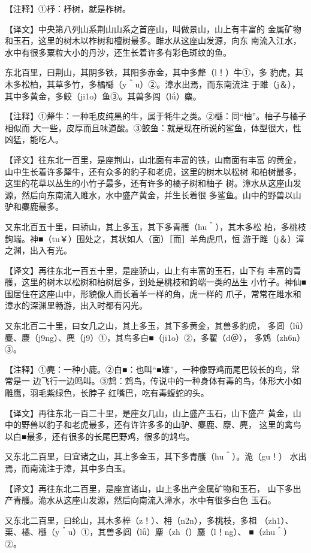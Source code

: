 \documentclass[a4paper,12pt,UTF8,twoside]{ctexbook}
\begin{document}
【注释】①杼：杼树，就是柞树。

【译文】中央第八列山系荆山山系之首座山，叫做景山，山上有丰富的 金属矿物和玉石，这里的树木以柞树和檀树最多。雎水从这座山发源，向东 南流入江水，水中有很多粟粒大小的丹沙，还生长着许多有彩色斑纹的鱼。

东北百里，曰荆山，其阴多铁，其阳多赤金，其中多犛（l！）牛①，多 豹虎，其木多松柏，其草多竹，多橘櫾（y＾u）②。漳水出焉，而东南流注 于雎（j＆），其中多黄金，多鲛（ji1o）鱼③。其兽多闾（lǘ）麋。

【注释】①犛牛：一种毛皮纯黑的牛，属于牦牛之类。②櫾：同“柚”。柚子与橘子相似而 大一些，皮厚而且味道酸。③鲛鱼：就是现在所说的鲨鱼，体型很大，性凶猛，能吃人。

【译文】往东北一百里，是座荆山，山北面有丰富的铁，山南面有丰富 的黄金，山中生长着许多犛牛，还有众多的豹子和老虎，这里的树木以松树 和柏树最多，这里的花草以丛生的小竹子最多，还有许多的橘子树和柚子 树。漳水从这座山发源，然后向东南流入雎水，水中盛产黄金，并生长着很 多鲨鱼。山中的野兽以山驴和麋鹿最多。

又东北百五十里，曰骄山，其上多玉，其下多青雘（hu＾），其木多松 柏，多桃枝鉤端。神■（tu￥）围处之，其状如人（面）［而］羊角虎爪，恒 游于雎（j＆）漳之渊，出入有光。

【译文】再往东北一百五十里，是座骄山，山上有丰富的玉石，山下有 丰富的青雘，这里的树木以松树和柏树居多，到处是桃枝和鉤端一类的丛生 小竹子。神仙■围居住在这座山中，形貌像人而长着羊一样的角，虎一样的 爪子，常常在雎水和漳水的深渊里畅游，出入时都有闪光。

又东北百二十里，曰女几之山，其上多玉，其下多黄金，其兽多豹虎， 多闾（lǘ）麋、麖（j9ng）、麂（j9）①，其鸟多白■（ji1o）②，多翟（d＠）， 多鸩（zh6n）③。

【注释】①麂：一种小鹿。②白■：也叫“■雉”，一种像野鸡而尾巴较长的鸟，常常是一 边飞行一边鸣叫。③鸩：鸩鸟，传说中的一种身体有毒的鸟，体形大小如雕鹰，羽毛紫绿色，长脖子 红嘴巴，吃有毒蝮蛇的头。

【译文】再往东北一百二十里，是座女几山，山上盛产玉石，山下盛产 黄金，山中的野兽以豹子和老虎最多，还有许许多多的山驴、麋鹿、麖、麂， 这里的禽鸟以白■最多，还有很多的长尾巴野鸡，很多的鸩鸟。

又东北二百里，曰宜诸之山，其上多金玉，其下多青雘（hu＾）。洈（gu！） 水出焉，而南流注于漳，其中多白玉。

【译文】再往东北二百里，是座宜诸山，山上多出产金属矿物和玉石， 山下多出产青雘。洈水从这座山发源，然后向南流入漳水，水中有很多白色 玉石。

又东北二百里，曰纶山，其木多梓（z！）、枏（n2n），多桃枝，多柤 （zh1）、栗、橘、櫾（y＾u）①，其兽多闾（lǚ）麈（zh（）麢（l！ng）、 ■（zhu＾）②。
\end{document}
